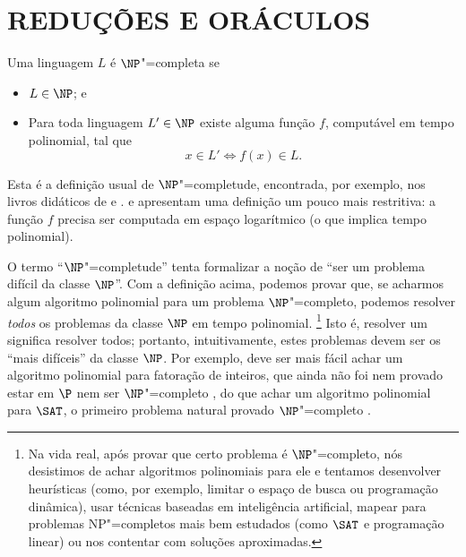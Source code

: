 \section{REDUÇÕES E ORÁCULOS}
\label{sec:oracles_and_reductions}

\begin{definition}[$\NP$"=completude]
    Uma linguagem $L$ é $\NP$"=completa se
    \begin{itemize}
        \item $L \in \NP$; e
        \item Para toda linguagem $L' \in \NP$ existe alguma função $f$,
            computável em tempo polinomial,
            tal que
            \begin{equation*}
                x \in L' \iff f(x) \in L.
            \end{equation*}
    \end{itemize}
\end{definition}

Esta é a definição usual de $\NP$"=completude,
encontrada, por exemplo,
nos livros didáticos de 
e .
 e 
apresentam uma definição um pouco mais restritiva:
a função $f$ precisa ser computada em espaço logarítmico
(o que implica tempo polinomial).

O termo ``$\NP$"=completude'' tenta formalizar a noção de
``ser um problema difícil da classe $\NP$''.
Com a definição acima,
podemos provar que,
se acharmos algum algoritmo polinomial para um problema $\NP$"=completo,
podemos resolver \emph{todos} os problemas da classe $\NP$ em tempo polinomial.%
\footnote{
    Na vida real,
    após provar que certo problema é $\NP$"=completo,
    nós desistimos de achar algoritmos polinomiais para ele
    e tentamos desenvolver heurísticas
    (como, por exemplo, limitar o espaço de busca ou programação dinâmica),
    usar técnicas baseadas em inteligência artificial,
    mapear para problemas NP"=completos mais bem estudados
    (como $\SAT$ e programação linear)
    ou nos contentar com soluções aproximadas.
}
Isto é,
resolver um significa resolver todos;
portanto,
intuitivamente,
estes problemas devem ser os ``mais difíceis'' da classe $\NP$.
Por exemplo,
deve ser mais fácil achar um algoritmo polinomial para fatoração de inteiros,
que ainda não foi nem provado estar em $\P$
nem ser $\NP$"=completo \cite[p.~120]{DuKo2014},
do que achar um algoritmo polinomial para $\SAT$,
o primeiro problema natural provado $\NP$"=completo \cite[p.~80]{DuKo2014}.

